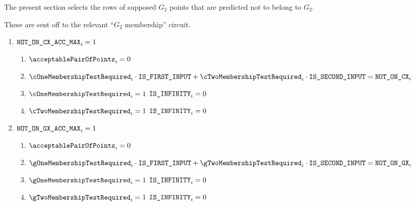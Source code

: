 The present section selects the rows of supposed $G_2$ points that are predicted not to belong to $G_2$.


These are sent off to the relevant ``$G_2$ membership'' circuit.
\begin{enumerate}
    \item \If $\texttt{NOT\_ON\_CX\_ACC\_MAX}_{i} = 1$ \Then
          \begin{enumerate}
              \item $\acceptablePairOfPoints_{i} = 0$
              \item $\cOneMembershipTestRequired _{i} \cdot \isFirstInput + \cTwoMembershipTestRequired _{i} \cdot \isSecondInput = \notOnCX_{i}$ %
              \item \If $\cOneMembershipTestRequired _{i} = 1$ \Then $\texttt{IS\_INFINITY}_{i} = 0$
              \item \If $\cTwoMembershipTestRequired _{i} = 1$ \Then $\texttt{IS\_INFINITY}_{i} = 0$
          \end{enumerate}
    \item \If $\texttt{NOT\_ON\_GX\_ACC\_MAX}_{i} = 1$ \Then
          \begin{enumerate}
              \item $\acceptablePairOfPoints_{i} = 0$
              \item $\gOneMembershipTestRequired _{i} \cdot \isFirstInput + \gTwoMembershipTestRequired _{i} \cdot \isSecondInput = \notOnGX_{i}$ %
              \item \If $\gOneMembershipTestRequired _{i} = 1$ \Then $\texttt{IS\_INFINITY}_{i} = 0$
              \item \If $\gTwoMembershipTestRequired _{i} = 1$ \Then $\texttt{IS\_INFINITY}_{i} = 0$
          \end{enumerate}
\end{enumerate}

